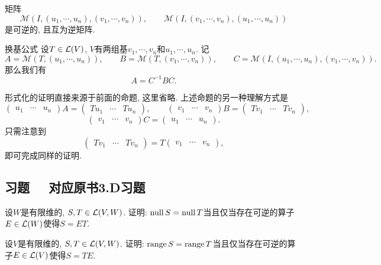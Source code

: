 \begin{example}
	矩阵$$\mathcal{M} (I,(u_1,\cdots ,u_n),(v_1,\cdots ,v_n)),\qquad \mathcal{M} (I,(v_1,\cdots ,v_n),(u_1,\cdots ,u_n))$$
	是可逆的, 且互为逆矩阵. 
\end{example}

\begin{proposition}{换基公式}
	设$T\in \mathcal{L} (V)$, $V$有两组基$v_1,\cdots ,v_n$和$u_1,\cdots ,u_n$. 记$$A = \mathcal{M}(T,(u_1,\cdots ,u_n)),\qquad B=\mathcal{M}(T,(v_1,\cdots ,v_n)),\qquad C=\mathcal{M}(I,(u_1,\cdots ,u_n),(v_1,\cdots ,v_n)).$$
	那么我们有$$A=C^{-1}BC.$$
\end{proposition}

形式化的证明直接来源于前面的命题, 这里省略. 上述命题的另一种理解方式是$$\begin{pmatrix}
 u_1 & \cdots & u_n
\end{pmatrix} A = \begin{pmatrix}
 Tu_1 & \cdots & Tu_n
\end{pmatrix},\qquad \begin{pmatrix}
 v_1 & \cdots & v_n
\end{pmatrix} B = \begin{pmatrix}
 Tv_1 & \cdots & Tv_n
\end{pmatrix}, $$
$$\begin{pmatrix}
 v_1 & \cdots & v_n
\end{pmatrix} C = \begin{pmatrix}
 u_1 & \cdots & u_n
\end{pmatrix}. $$
只需注意到$$\begin{pmatrix}
 Tv_1 & \cdots & Tv_n
\end{pmatrix} = T\begin{pmatrix}
 v_1 & \cdots & v_n
\end{pmatrix}, $$
即可完成同样的证明. 

\subsection*{习题  ~~\small 对应原书3.D习题}

\begin{exercise} %
	设$W$是有限维的, $S,T \in \mathcal{L} (V,W)$. 证明: $\operatorname{null} S = \operatorname{null} T$当且仅当存在可逆的算子$E \in \mathcal{L} (W)$使得$S=ET$. 
\end{exercise}
\vspace{1em}

\begin{exercise} %
	设$V$是有限维的, $S,T \in \mathcal{L} (V,W)$. 证明: $\operatorname{range} S = \operatorname{range} T$当且仅当存在可逆的算子$E \in \mathcal{L} (V)$使得$S=TE$. 
\end{exercise}
\vspace{1em}

